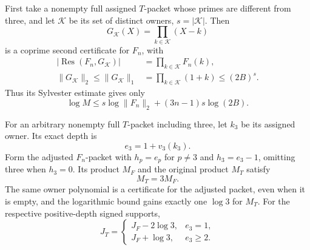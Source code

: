 \begin{proposition}
\label{cg19-automatic}
First take a nonempty full assigned \(T\)-packet whose primes
are different from three, and let \(\mathcal K\) be its set of
distinct owners, \(s=|\mathcal K|\). Then
\[
 G_{\mathcal K}(X)=\prod_{k\in\mathcal K}(X-k)
\]
is a coprime second certificate for \(F_n\), with
\begin{align}
 |\operatorname{Res}(F_n,G_{\mathcal K})|
   &=\prod_{k\in\mathcal K}F_n(k), \label{cg19-auto-res}\\
 \|G_{\mathcal K}\|_2\le\|G_{\mathcal K}\|_1
   &=\prod_{k\in\mathcal K}(1+k)\le(2B)^s. \label{cg19-auto-norm}
\end{align}
Thus its Sylvester estimate gives only
\[
 \log M\le s\log\|F_n\|_2+(3n-1)s\log(2B).
\]

For an arbitrary nonempty full \(T\)-packet including three, let
\(k_3\) be its assigned owner. Its exact depth is
\begin{equation}
 e_3=1+v_3(k_3).
 \label{cg19-three-depth}
\end{equation}
Form the adjusted \(F_n\)-packet with \(h_p=e_p\) for \(p\ne3\)
and \(h_3=e_3-1\), omitting three when \(h_3=0\). Its product
\(M_F\) and the original product \(M_T\) satisfy
\begin{equation}
 M_T=3M_F.
 \label{cg19-three-product}
\end{equation}
The same owner polynomial is a certificate for the adjusted
packet, even when it is empty, and the logarithmic bound gains
exactly one \(\log3\) for \(M_T\).
For the respective positive-depth signed supports,
\begin{equation}
 J_T=
 \begin{cases}
  J_F-2\log3,&e_3=1,\\
  J_F+\log3,&e_3\ge2.
 \end{cases}
 \label{cg19-three-signed}
\end{equation}
\end{proposition}
